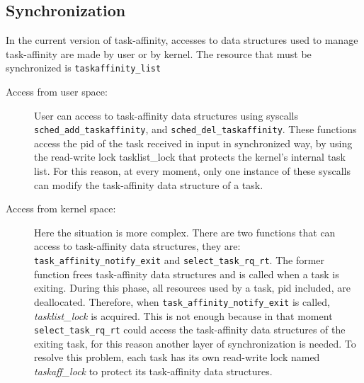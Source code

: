 \subsection{Synchronization}

In the current version of task-affinity, accesses to data structures used to manage task-affinity are made by user or by kernel. The resource that must be
synchronized is \texttt{taskaffinity\_list}

\begin{description}

\item[Access from user space:] User can access to task-affinity data structures using syscalls \texttt{sched\_add\_taskaffinity}, and 
\texttt{sched\_del\_taskaffinity}. These functions access the pid of the task received in input in synchronized way, by using the read-write lock
tasklist\_lock that protects the kernel's internal task list. For this reason, at every moment, only one instance of these syscalls can modify the
task-affinity data structure of a task.

\item[Access from kernel space:] Here the situation is more complex. There are two functions that can access to task-affinity data structures, they are:
\texttt{task\_affinity\_notify\_exit} and \texttt{select\_task\_rq\_rt}. The former function frees task-affinity data structures and is called when a 
task is exiting. During this phase, all resources used by a task, pid included, are deallocated. Therefore, when \texttt{task\_affinity\_notify\_exit} is 
called, \textit{tasklist\_lock} is acquired. This is not enough because in that moment \texttt{select\_task\_rq\_rt} could access the task-affinity data 
structures of the exiting task, for this reason another layer of synchronization is needed. To resolve this problem, each task has its own read-write lock 
named \textit{taskaff\_lock} to protect its task-affinity data structures. 

\end{description}


